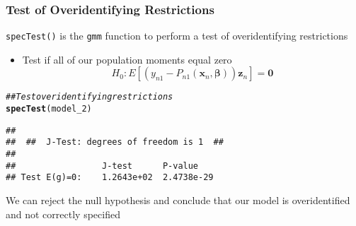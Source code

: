 \documentclass{beamer}\usepackage[]{graphicx}\usepackage[]{xcolor}
\makeatletter
\newcommand{\hlcom}[1]{\textcolor[rgb]{0.678,0.584,0.686}{\textit{#1}}}%
\newcommand{\hlstd}[1]{\textcolor[rgb]{0.345,0.345,0.345}{#1}}%
\newcommand{\hlkwd}[1]{\textcolor[rgb]{0.737,0.353,0.396}{\textbf{#1}}}%
\newenvironment{kframe}{%
 \def\at@end@of@kframe{}%
 \ifinner\ifhmode%
  \def\at@end@of@kframe{\end{minipage}}%
  \begin{minipage}{\columnwidth}%
 \fi\fi%
 \def\FrameCommand##1{\hskip\@totalleftmargin \hskip-\fboxsep
 \colorbox{shadecolor}{##1}\hskip-\fboxsep
     \hskip-\linewidth \hskip-\@totalleftmargin \hskip\columnwidth}%
 \MakeFramed {\advance\hsize-\width
   \@totalleftmargin\z@ \linewidth\hsize
   \@setminipage}}%
 {\par\unskip\endMakeFramed%
 \at@end@of@kframe}
\newenvironment{knitrout}{}{} %
\makeatother
\begin{document}
\begin{frame}[fragile]\frametitle{Test of Overidentifying Restrictions}
  	\texttt{specTest()} is the \texttt{gmm} function to perform a test of overidentifying restrictions
  	\begin{itemize}
  		\item Test if all of our population moments equal zero
  		$$H_0: E[\left( y_{n1} - P_{n1}(\bm{x}_n, \bm{\beta}) \right) \bm{z}_n] = \bm{0}$$
  	\end{itemize}
\begin{knitrout}\footnotesize
{}\color{fgcolor}\begin{kframe}
\begin{alltt}
\hlcom{## Test overidentifying restrictions}
\hlkwd{specTest}\hlstd{(model_2)}
\end{alltt}
\begin{verbatim}
## 
##  ##  J-Test: degrees of freedom is 1  ## 
## 
##                 J-test      P-value   
## Test E(g)=0:    1.2643e+02  2.4738e-29
\end{verbatim}
\end{kframe}
\end{knitrout}
    \vspace{2ex}
    We can reject the null hypothesis and conclude that our model is overidentified and not correctly specified
\end{frame}
\end{document}
